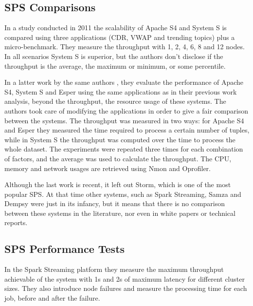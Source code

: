 \documentclass[ppgc,diss,english]{iiufrgs}
\begin{document}
\subsection{SPS Comparisons}

In a study conducted in 2011 \cite{dayarathna2011performance} the scalability of Apache S4 and System S is compared using three applications (CDR, VWAP and trending topics) plus a micro-benchmark. They measure the throughput with 1, 2, 4, 6, 8 and 12 nodes. In all scenarios System S is superior, but the authors don't disclose if the throughput is the average, the maximum or minimum, or some percentile.

In a latter work by the same authors \cite{dayarathna2013performance}, they evaluate the performance of Apache S4, System S and Esper using the same applications as in their previous work analysis, beyond the throughput, the resource usage of these systems. The authors took care of modifying the applications in order to give a fair comparison between the systems. The throughput was measured in two ways: for Apache S4 and Esper they measured the time required to process a certain number of tuples, while in System S the throughput was computed over the time to process the whole dataset. The experiments were repeated three times for each combination of factors, and the average was used to calculate the throughput. The CPU, memory and network usages are retrieved using Nmon and Oprofiler.

Although the last work is recent, it left out Storm, which is one of the most popular SPS. At that time other systems, such as Spark Streaming, Samza and Dempsy were just in its infancy, but it means that there is no comparison between these systems in the literature, nor even in white papers or technical reports.

\subsection{SPS Performance Tests}

In the Spark Streaming platform \cite{zaharia2012discretized} they measure the maximum throughput achievable of the system with 1s and 2s of maximum latency for different cluster sizes. They also introduce node failures and measure the processing time for each job, before and after the failure.
\end{document}
